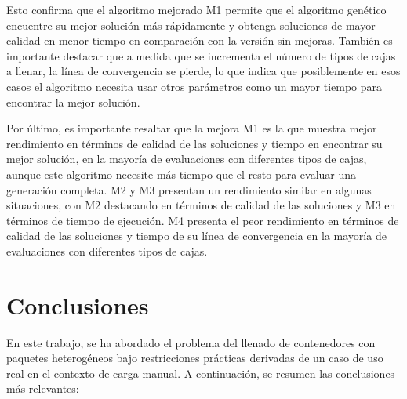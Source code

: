 \documentclass[openany]{article}
\begin{document}
Esto confirma que el algoritmo mejorado M1 permite que el algoritmo genético encuentre su mejor solución más rápidamente y obtenga soluciones de mayor calidad en menor tiempo en comparación con la versión sin mejoras. También es importante destacar que a medida que se incrementa el número de tipos de cajas a llenar, la línea de convergencia se pierde, lo que indica que posiblemente en esos casos el algoritmo necesita usar otros parámetros como un mayor tiempo para encontrar la mejor solución.

Por último, es importante resaltar que la mejora M1 es la que muestra mejor rendimiento en términos de calidad de las soluciones y tiempo en encontrar su mejor solución, en la mayoría de evaluaciones con diferentes tipos de cajas, aunque este algoritmo necesite más tiempo que el resto para evaluar una generación completa. M2 y M3 presentan un rendimiento similar en algunas situaciones, con M2 destacando en términos de calidad de las soluciones y M3 en términos de tiempo de ejecución. M4 presenta el peor rendimiento en términos de calidad de las soluciones y tiempo de su línea de convergencia en la mayoría de evaluaciones con diferentes tipos de cajas.









\newpage








\section{Conclusiones}

En este trabajo, se ha abordado el problema del llenado de contenedores con paquetes heterogéneos bajo restricciones prácticas derivadas de un caso de uso real en el contexto de carga manual. A continuación, se resumen las conclusiones más relevantes:
\end{document}
